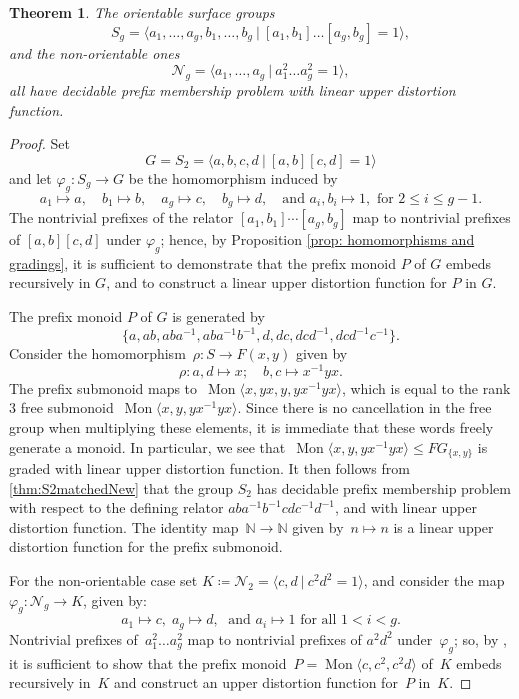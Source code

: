 \documentclass[11pt]{amsart}
\newcommand{\Mgen}[1]{\operatorname{Mon}\bigl\langle #1 \bigr\rangle}
\newcommand{\Gpres}[2]{\bigl\langle #1\:|\:#2 \bigr\rangle}
\newcommand{\N}{\mathbb{N}}
\theoremstyle{plain}
\newtheorem{theorem}{Theorem}[section]
\theoremstyle{definition}
\begin{document}
\begin{theorem}\label{thm:PMPDistortionSurface} The orientable surface groups 
\[
S_g = \Gpres{a_1, \ldots, a_g, b_1, \ldots, b_g}{[a_1,b_1]\ldots[a_g,b_g]= 1},
\]
and the non-orientable ones
\[
\mathcal{N}_g = \Gpres{a_1, \ldots, a_g}{a_1^2 \ldots a_g^2= 1},
\]
all have decidable prefix membership problem with linear upper distortion function.
\end{theorem}
\begin{proof}
Set
\[
G = S_2 = \Gpres{a, b, c, d}{[a, b][c, d]= 1}
\]
and let $\varphi_g \colon S_g \rightarrow G$ be the homomorphism induced by 
\[
a_1 \mapsto a, \quad 
b_1 \mapsto b, \quad 
a_g \mapsto c, \quad 
b_g \mapsto d, \quad 
\text{and } a_i, b_i \mapsto 1, \text{ for } 2 \leq i \leq g-1.
\]
The nontrivial prefixes of the relator $[a_1, b_1] \cdots [a_g, b_g]$ map to nontrivial prefixes of $[a, b][c, d]$ under $\varphi_g$; hence, by Proposition \ref{prop: homomorphisms and gradings}, it is sufficient to demonstrate that the prefix monoid $P$ of $G$ embeds recursively in $G$, and to construct a linear upper distortion function for $P$ in $G$.

The prefix monoid $P$ of $G$ is generated by 
\[
\{ 
a, ab, aba^{-1}, aba^{-1}b^{-1}, 
d, dc, dcd^{-1}, dcd^{-1}c^{-1}
\}.
\]
Consider the homomorphism~$\rho \colon S \rightarrow F(x, y)$ given by
\[
\rho \colon a, d \mapsto x; \quad b,c \mapsto x^{-1}yx
.
\]
The prefix submonoid maps to~$\Mgen{x, yx, y, yx^{-1}yx}$, which is equal to the rank 3 free submonoid~$\Mgen{x, y, yx^{-1}yx}$. 
Since there is no cancellation in the free group when multiplying these elements, it is immediate that these words freely generate a monoid. In particular, we see that~$\Mgen{x, y, yx^{-1}yx} \leq FG_{\{ x,y \}}$ is graded with linear upper distortion function. 
It then follows from \cref{thm:S2matchedNew} that the group $S_2$ has decidable prefix membership problem with respect to the defining relator $aba^{-1}b^{-1}cdc^{-1}d^{-1}$, and with linear upper distortion function. The identity map~$\N \rightarrow \N$ given by~$n \mapsto n$ is a linear upper distortion function for the prefix submonoid.

For the non-orientable case set $K \coloneqq \mathcal{N}_2 = \Gpres{c, d}{c^2 d^2= 1}$, and consider the map~$\varphi_g: \mathcal{N}_g \longrightarrow K$, given by: 
\[
a_1 \mapsto c,\; a_g \mapsto d, \; \text{ and } a_i \mapsto 1 \text{ for all } 1 < i < g.
\]
Nontrivial prefixes of~$a_1^2 \ldots a_g^2$ map to nontrivial prefixes of
$a^2 d^2$ under~$\varphi_g$; so, by , it is sufficient to show that the prefix monoid~$P = \Mgen{c, c^2, c^2 d}$ of~$K$ embeds recursively in~$K$ and construct an upper distortion function for~$P$ in~$K$. 


\end{proof}
\end{document}
